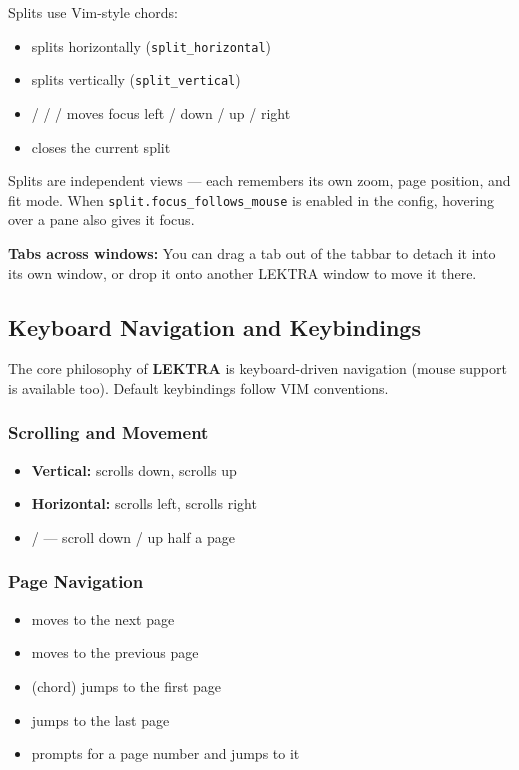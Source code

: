 \documentclass[a4paper,12pt]{article}
\begin{document}
Splits use Vim-style  chords:
\begin{itemize}[leftmargin=*]
    \item {} splits horizontally (\texttt{split\_horizontal})
    \item {} splits vertically (\texttt{split\_vertical})
    \item {} /  /  /  moves focus left / down / up / right
    \item {} closes the current split
\end{itemize}

Splits are independent views — each remembers its own zoom, page position, and fit mode. When \texttt{split.focus\_follows\_mouse} is enabled in the config, hovering over a pane also gives it focus.

\textbf{Tabs across windows:} You can drag a tab out of the tabbar to detach it into its own window, or drop it onto another LEKTRA window to move it there.

\subsection{Keyboard Navigation and Keybindings}

The core philosophy of \textbf{LEKTRA} is keyboard-driven navigation (mouse support is available too). Default keybindings follow VIM conventions.

\subsubsection{Scrolling and Movement}

\begin{itemize}[leftmargin=*]
    \item \textbf{Vertical:}  scrolls down,\;  scrolls up
    \item \textbf{Horizontal:}  scrolls left,\;  scrolls right
    \item {} /  — scroll down / up half a page
\end{itemize}

\subsubsection{Page Navigation}

\begin{itemize}[leftmargin=*]
    \item {} moves to the next page
    \item {} moves to the previous page
    \item {} (chord) jumps to the first page
    \item {} jumps to the last page
    \item {} prompts for a page number and jumps to it
\end{itemize}
\end{document}

